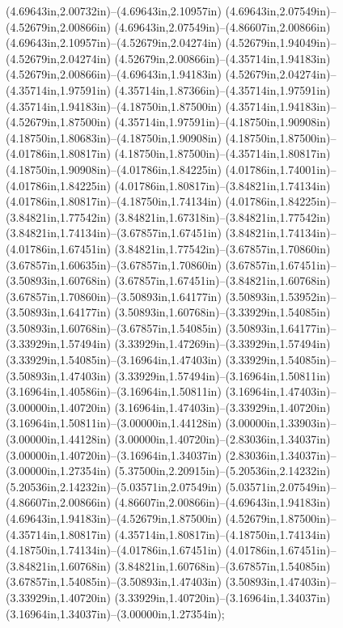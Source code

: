 (4.69643in,2.00732in)--(4.69643in,2.10957in) (4.69643in,2.07549in)--(4.52679in,2.00866in) (4.69643in,2.07549in)--(4.86607in,2.00866in) (4.69643in,2.10957in)--(4.52679in,2.04274in) (4.52679in,1.94049in)--(4.52679in,2.04274in) (4.52679in,2.00866in)--(4.35714in,1.94183in) (4.52679in,2.00866in)--(4.69643in,1.94183in) (4.52679in,2.04274in)--(4.35714in,1.97591in) (4.35714in,1.87366in)--(4.35714in,1.97591in) (4.35714in,1.94183in)--(4.18750in,1.87500in) (4.35714in,1.94183in)--(4.52679in,1.87500in) (4.35714in,1.97591in)--(4.18750in,1.90908in) (4.18750in,1.80683in)--(4.18750in,1.90908in) (4.18750in,1.87500in)--(4.01786in,1.80817in) (4.18750in,1.87500in)--(4.35714in,1.80817in) (4.18750in,1.90908in)--(4.01786in,1.84225in) (4.01786in,1.74001in)--(4.01786in,1.84225in) (4.01786in,1.80817in)--(3.84821in,1.74134in) (4.01786in,1.80817in)--(4.18750in,1.74134in) (4.01786in,1.84225in)--(3.84821in,1.77542in) (3.84821in,1.67318in)--(3.84821in,1.77542in) (3.84821in,1.74134in)--(3.67857in,1.67451in) (3.84821in,1.74134in)--(4.01786in,1.67451in) (3.84821in,1.77542in)--(3.67857in,1.70860in) (3.67857in,1.60635in)--(3.67857in,1.70860in) (3.67857in,1.67451in)--(3.50893in,1.60768in) (3.67857in,1.67451in)--(3.84821in,1.60768in) (3.67857in,1.70860in)--(3.50893in,1.64177in) (3.50893in,1.53952in)--(3.50893in,1.64177in) (3.50893in,1.60768in)--(3.33929in,1.54085in) (3.50893in,1.60768in)--(3.67857in,1.54085in) (3.50893in,1.64177in)--(3.33929in,1.57494in) (3.33929in,1.47269in)--(3.33929in,1.57494in) (3.33929in,1.54085in)--(3.16964in,1.47403in) (3.33929in,1.54085in)--(3.50893in,1.47403in) (3.33929in,1.57494in)--(3.16964in,1.50811in) (3.16964in,1.40586in)--(3.16964in,1.50811in) (3.16964in,1.47403in)--(3.00000in,1.40720in) (3.16964in,1.47403in)--(3.33929in,1.40720in) (3.16964in,1.50811in)--(3.00000in,1.44128in) (3.00000in,1.33903in)--(3.00000in,1.44128in) (3.00000in,1.40720in)--(2.83036in,1.34037in) (3.00000in,1.40720in)--(3.16964in,1.34037in) (2.83036in,1.34037in)--(3.00000in,1.27354in) (5.37500in,2.20915in)--(5.20536in,2.14232in) (5.20536in,2.14232in)--(5.03571in,2.07549in) (5.03571in,2.07549in)--(4.86607in,2.00866in) (4.86607in,2.00866in)--(4.69643in,1.94183in) (4.69643in,1.94183in)--(4.52679in,1.87500in) (4.52679in,1.87500in)--(4.35714in,1.80817in) (4.35714in,1.80817in)--(4.18750in,1.74134in) (4.18750in,1.74134in)--(4.01786in,1.67451in) (4.01786in,1.67451in)--(3.84821in,1.60768in) (3.84821in,1.60768in)--(3.67857in,1.54085in) (3.67857in,1.54085in)--(3.50893in,1.47403in) (3.50893in,1.47403in)--(3.33929in,1.40720in) (3.33929in,1.40720in)--(3.16964in,1.34037in) (3.16964in,1.34037in)--(3.00000in,1.27354in);
